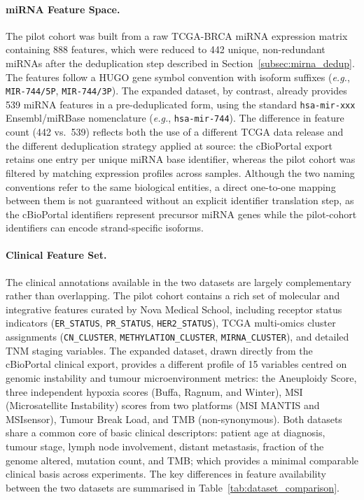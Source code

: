 \paragraph{miRNA Feature Space.}
The pilot cohort was built from a raw TCGA-BRCA miRNA expression matrix containing
888 features, which were reduced to 442 unique, non-redundant miRNAs after
the deduplication step described in Section~\ref{subsec:mirna_dedup}. The features follow a
HUGO gene symbol convention with isoform suffixes
(\textit{e.g.}, \texttt{MIR-744/5P}, \texttt{MIR-744/3P}).
The expanded dataset, by contrast, already provides 539 miRNA features in a
pre-deduplicated form, using the standard \texttt{hsa-mir-xxx} Ensembl/miRBase
nomenclature (\textit{e.g.}, \texttt{hsa-mir-744}). The difference in feature count
(442 vs.\ 539) reflects both the use of a different TCGA data release and the
different deduplication strategy applied at source: the cBioPortal export retains
one entry per unique miRNA base identifier, whereas the pilot cohort was filtered
by matching expression profiles across samples.
Although the two naming conventions refer to the same biological entities, a
direct one-to-one mapping between them is not guaranteed without an explicit
identifier translation step, as the cBioPortal identifiers represent precursor
miRNA genes while the pilot-cohort identifiers can encode strand-specific isoforms.

\paragraph{Clinical Feature Set.}
The clinical annotations available in the two datasets are largely complementary
rather than overlapping. The pilot cohort contains a rich set of molecular and
integrative features curated by Nova Medical School, including receptor status
indicators (\texttt{ER\_STATUS}, \texttt{PR\_STATUS}, \texttt{HER2\_STATUS}),
TCGA multi-omics cluster assignments
(\texttt{CN\_CLUSTER}, \texttt{METHYLATION\_CLUSTER}, \texttt{MIRNA\_CLUSTER}),
and detailed TNM staging variables. The expanded dataset, drawn directly from the
cBioPortal clinical export, provides a different profile of 15 variables centred on
genomic instability and tumour microenvironment metrics: the Aneuploidy Score,
three independent hypoxia scores (Buffa, Ragnum, and Winter), MSI
(Microsatellite Instability) scores from two platforms (MSI MANTIS and
MSIsensor), Tumour Break Load, and TMB (non-synonymous).
Both datasets share a common core of basic clinical descriptors: patient age at
diagnosis, tumour stage, lymph node involvement, distant metastasis, fraction of
the genome altered, mutation count, and TMB; which provides a minimal
comparable clinical basis across experiments. The key differences in feature
availability between the two datasets are summarised in Table~\ref{tab:dataset_comparison}.

